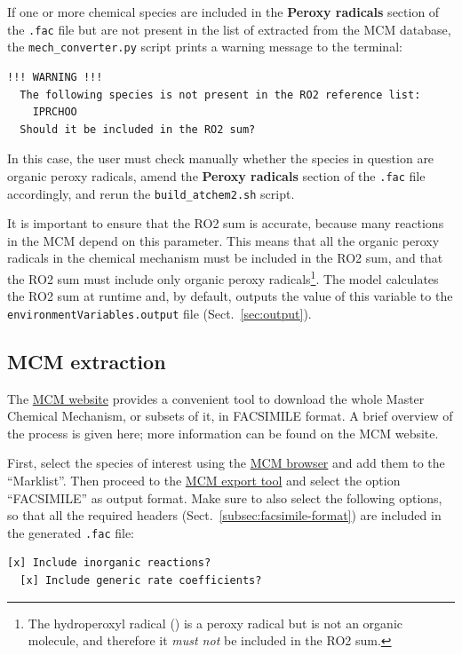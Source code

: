 If one or more chemical species are included in the \textbf{Peroxy radicals} section of the
\texttt{.fac} file but are not present in the list of  extracted from the MCM database,
the \texttt{mech\_converter.py} script prints a warning message to the terminal:

\begin{Verbatim}[fontsize=\small]
        !!! WARNING !!!
  The following species is not present in the RO2 reference list:
    IPRCHOO
  Should it be included in the RO2 sum?
\end{Verbatim}

In this case, the user must check manually whether the species in question are organic peroxy
radicals, amend the \textbf{Peroxy radicals} section of the \texttt{.fac} file accordingly, and
rerun the \texttt{build\_atchem2.sh} script.

It is important to ensure that the RO2 sum is accurate, because many reactions in the MCM
depend on this parameter. This means that all the organic peroxy radicals in the chemical
mechanism must be included in the RO2 sum, and that the RO2 sum must include only organic
peroxy radicals\footnote{The hydroperoxyl radical () is a peroxy radical but is not an
  organic molecule, and therefore it \emph{must not} be included in the RO2 sum.}. The model
calculates the RO2 sum at runtime and, by default, outputs the value of this variable to the
\texttt{environmentVariables.output} file (Sect.~\ref{sec:output}).

\subsection{MCM extraction} \label{subsec:mcm-extraction}

The \href{https://mcm.york.ac.uk/MCM}{MCM website} provides a
convenient tool to download the whole Master Chemical Mechanism, or
subsets of it, in FACSIMILE format. A brief overview of the process is
given here; more information can be found on the MCM website.

First, select the species of interest using the
\href{https://mcm.york.ac.uk/MCM/browse}{MCM browser} and add them to
the ``Marklist''. Then proceed to the
\href{https://mcm.york.ac.uk/MCM/export}{MCM export tool} and select
the option ``FACSIMILE'' as output format. Make sure to also select
the following options, so that all the required headers
(Sect.~\ref{subsec:facsimile-format}) are included in the generated
\texttt{.fac} file:

\begin{Verbatim}[fontsize=\small]
  [x] Include inorganic reactions?
  [x] Include generic rate coefficients?
\end{Verbatim}


